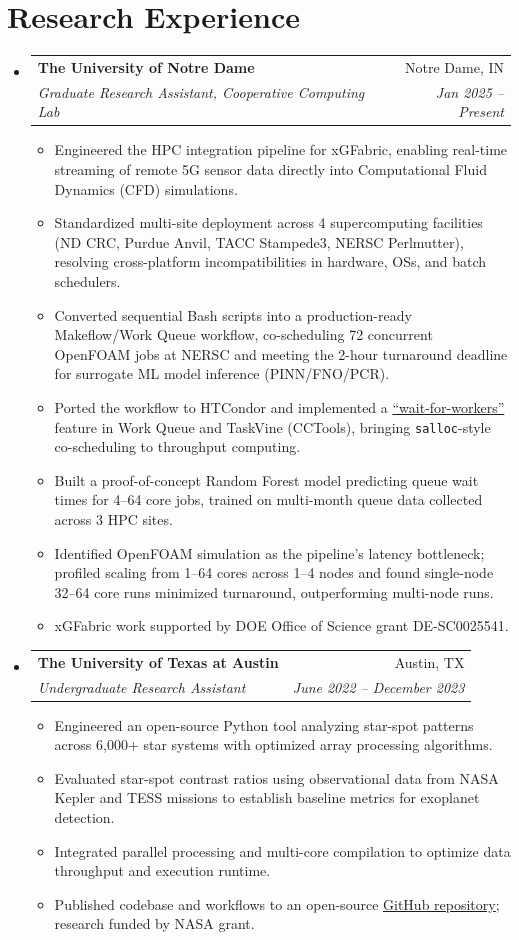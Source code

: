 \documentclass[letterpaper,11pt]{article}
\makeatletter
\newcommand{\docItem}[1]{
  \item\small{
    {#1\vspace{-2pt}}
  }
}
\newcommand{\docSubheading}[4]{
  \vspace{-2pt}
\item
  \begin{tabular*}{\textwidth}[t]{l@{\extracolsep{\fill}}r}
    \textbf{#1} & #2 \\
    \small\textit{#3} & \small \textit{#4} \\
  \end{tabular*}\vspace{-7pt}
}
\newcommand{\docSubHeadingListStart}{\begin{itemize}[leftmargin=0in, label={}]}
\newcommand{\docSubHeadingListEnd}{\end{itemize}\vspace{-5pt}}
\newcommand{\docItemListStart}{\begin{itemize}\justifying}
\newcommand{\docItemListEnd}{\end{itemize}\vspace{-5pt}}
\makeatother
\begin{document}
\section{Research Experience}
  \docSubHeadingListStart
    \docSubheading
      {The University of Notre Dame}{Notre Dame, IN}
      {Graduate Research Assistant, Cooperative Computing Lab}{Jan 2025 -- Present}
      \docItemListStart
        \docItem{Engineered the HPC integration pipeline for xGFabric, enabling real-time streaming of remote 5G sensor data directly into Computational Fluid Dynamics (CFD) simulations.}
        \docItem{Standardized multi-site deployment across 4 supercomputing facilities (ND CRC, Purdue Anvil, TACC Stampede3, NERSC Perlmutter), resolving cross-platform incompatibilities in hardware, OSs, and batch schedulers.}
        \docItem{Converted sequential Bash scripts into a production-ready Makeflow/Work Queue workflow, co-scheduling 72 concurrent OpenFOAM jobs at NERSC and meeting the 2-hour turnaround deadline for surrogate ML model inference (PINN/FNO/PCR).}
        \docItem{Ported the workflow to HTCondor and implemented a \href{https://github.com/cooperative-computing-lab/cctools/pull/4546}{``wait-for-workers''} feature in Work Queue and TaskVine (CCTools), bringing \texttt{salloc}-style co-scheduling to throughput computing.}
        \docItem{Built a proof-of-concept Random Forest model predicting queue wait times for 4--64 core jobs, trained on multi-month queue data collected across 3 HPC sites.}
        \docItem{Identified OpenFOAM simulation as the pipeline's latency bottleneck; profiled scaling from 1--64 cores across 1--4 nodes and found single-node 32--64 core runs minimized turnaround, outperforming multi-node runs.}
        \docItem{xGFabric work supported by DOE Office of Science grant DE-SC0025541.}
      \docItemListEnd

    \docSubheading
      {The University of Texas at Austin}{Austin, TX}
      {Undergraduate Research Assistant}{June 2022 -- December 2023}
        \docItemListStart
          \docItem{Engineered an open-source Python tool analyzing star-spot patterns across 6,000+ star systems with optimized array processing algorithms.}
          \docItem{Evaluated star-spot contrast ratios using observational data from NASA Kepler and TESS missions to establish baseline metrics for exoplanet detection.}
          \docItem{Integrated parallel processing and multi-core compilation to optimize data throughput and execution runtime.}
          \docItem{Published codebase and workflows to an open-source \href{https://github.com/BrownDwarf/contracosta/}{GitHub repository}; research funded by NASA grant.}
        \docItemListEnd
  \docSubHeadingListEnd
\end{document}

